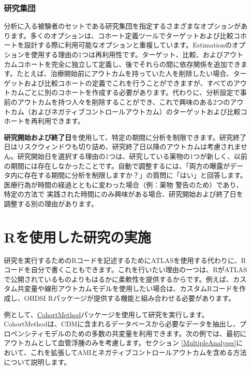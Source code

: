\documentclass[
  11pt]{book}
\theoremstyle{definition}
\theoremstyle{definition}
\theoremstyle{definition}
\theoremstyle{definition}
\theoremstyle{remark}
\begin{document}
\subsubsection*{研究集団}\label{ux7814ux7a76ux96c6ux56e3}

分析に入る被験者のセットである研究集団を指定するさまざまなオプションがあります。多くのオプションは、コホート定義ツールでターゲットおよび比較コホートを設計する際に利用可能なオプションと重複しています。Estimationのオプションを使用する理由の1つは再利用性です。ターゲット、比較、およびアウトカムコホートを完全に独立して定義し、後でそれらの間に依存関係を追加できます。たとえば、治療開始前にアウトカムを持っていた人を削除したい場合、ターゲットおよび比較コホートの定義でこれを行うことができますが、すべてのアウトカムごとに別のコホートを作成する必要があります。代わりに、分析設定で事前のアウトカムを持つ人々を削除することができ、これで興味のある2つのアウトカム（およびネガティブコントロールアウトカム）のターゲットおよび比較コホートを再利用できます。

\textbf{研究開始および終了日}を使用して、特定の期間に分析を制限できます。研究終了日はリスクウィンドウも切り詰め、研究終了日以降のアウトカムは考慮されません。研究開始日を選択する理由の1つは、研究している薬物の1つが新しく、以前の期間には存在しなかったことです。自動で調整するには、「両方の曝露がデータ内に存在する期間に分析を制限しますか？」の質問に「はい」と回答します。医療行為が時間の経過とともに変わった場合（例：薬物 警告のため）であり、特定の方法で 実践された時間にのみ興味がある場合、研究開始および終了日を調整する別の理由があります。

\section{Rを使用した研究の実施}\label{pleR}

研究を実行するためのRコードを記述するためにATLASを使用する代わりに、Rコードを自分で書くこともできます。これを行いたい理由の一つは、RがATLASで公開されているものよりもはるかに柔軟性を提供するからです。例えば、カスタム共変量や線形アウトカムモデルを使用したい場合は、カスタムRコードを作成し、OHDSI Rパッケージが提供する機能と組み合わせる必要があります。

例として、\href{https://ohdsi.github.io/CohortMethod/}{CohortMethod}パッケージを使用して研究を実行します。CohortMethodは、CDMに含まれるデータベースから必要なデータを抽出し、プロペンシティモデルのための多数の共変量を利用できます。次の例では、最初にアウトカムとして血管浮腫のみを考慮します。セクション \ref{MultipleAnalyses}において、これを拡張してAMIとネガティブコントロールアウトカムを含める方法について説明します。
\end{document}
